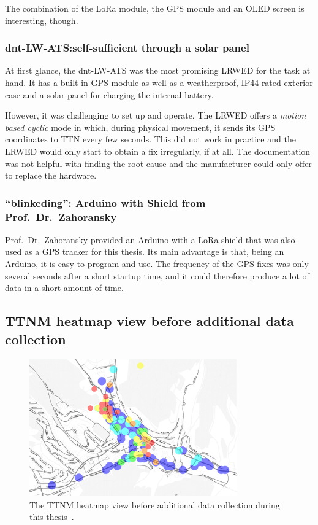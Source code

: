 The combination of the \ac{LoRa} module, the \ac{GPS} module and an \ac{OLED} screen is interesting, though.

\subsubsection{dnt-LW-ATS:\@ self-sufficient through a solar panel}

At first glance, the dnt-LW-ATS was the most promising \acl{LRWED} for the task at hand.
It has a built-in \ac{GPS} module as well as a weatherproof, IP44 rated exterior case and a solar panel for charging the internal battery.

However, it was challenging to set up and operate.
The \acl{LRWED} offers a \emph{motion based cyclic} mode in which, during physical movement, it sends its \ac{GPS} coordinates to \ac{TTN} every few seconds.
This did not work in practice and the \acl{LRWED} would only start to obtain a fix irregularly, if at all.
The documentation was not helpful with finding the root cause and the manufacturer could only offer to replace the hardware.

\subsubsection{``blinkeding'': Arduino with Shield from Prof.\ Dr.\ Zahoransky}

Prof.\ Dr.\ Zahoransky provided an Arduino with a \ac{LoRa} shield that was also used as a \ac{GPS} tracker for this thesis.
Its main advantage is that, being an Arduino, it is easy to program and use.
The frequency of the \ac{GPS} fixes was only several seconds after a short startup time, and it could therefore produce a lot of data in a short amount of time.

\subsection{\acl{TTNM} heatmap view before additional data collection}

\begin{figure}[htbp]
    \centering
    \includegraphics[width=0.8\textwidth]{pictures/ttn-mapper/ttnmapper_heatmap_before.png}
    \caption{
        The \ac{TTNM} heatmap view before additional data collection during this thesis~\cite{ttn_mapper_ttn_2023}.
    }\label{pic:ttnm-before-data-collection}
\end{figure}

